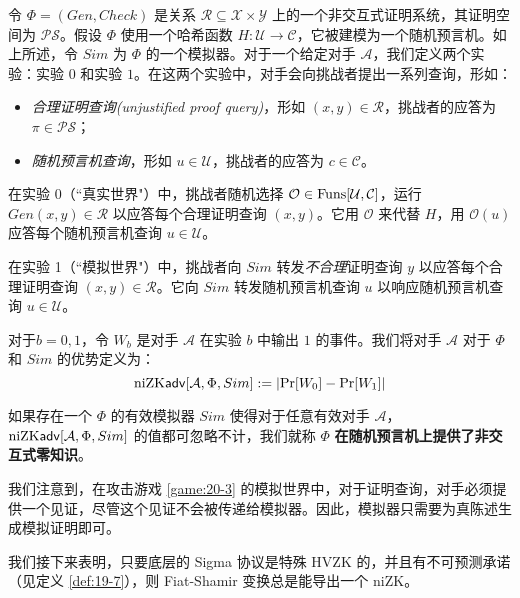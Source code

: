 \begin{game}[非交互式零知识]\label{game:20-3}
令 $\Phi=(Gen,Check)$ 是关系 $\mathcal{R}\subseteq\mathcal{X}\times\mathcal{Y}$ 上的一个非交互式证明系统，其证明空间为 $\mathcal{PS}$。假设 $\Phi$ 使用一个哈希函数 $H:\mathcal{U}\to\mathcal{C}$，它被建模为一个随机预言机。如上所述，令 $Sim$ 为 $\Phi$ 的一个模拟器。对于一个给定对手 $\mathcal{A}$，我们定义两个实验：实验 $0$ 和实验 $1$。在这两个实验中，对手会向挑战者提出一系列查询，形如：
\begin{itemize}
	\item \emph{合理证明查询(unjustified proof query)}，形如 $(x,y)\in\mathcal{R}$，挑战者的应答为 $\pi\in\mathcal{PS}$；
	\item \emph{随机预言机查询}，形如 $u\in\mathcal{U}$，挑战者的应答为 $c\in\mathcal{C}$。
\end{itemize}

在实验 0（``真实世界"）中，挑战者随机选择 $\mathcal{O}\in{\rm Funs}[\mathcal{U},\mathcal{C}]$，运行 $Gen(x,y)\in\mathcal{R}$ 以应答每个合理证明查询 $(x,y)$。它用 $\mathcal O$ 来代替 $H$，用 $\mathcal{O}(u)$ 应答每个随机预言机查询 $u\in\mathcal{U}$。

在实验 1（``模拟世界"）中，挑战者向 $Sim$ 转发\emph{不合理}证明查询 $y$ 以应答每个合理证明查询 $(x,y)\in\mathcal{R}$。它向 $Sim$ 转发随机预言机查询 $u$ 以响应随机预言机查询 $u\in\mathcal{U}$。

对于$b=0,1$，令 $W_b$ 是对手 $\mathcal{A}$ 在实验 $b$ 中输出 $1$ 的事件。我们将对手 $\mathcal{A}$ 对于 $\Phi$ 和 $Sim$ 的优势定义为：
$$
{\rm niZK\mathsf{adv}}[\mathcal{A},\Phi,Sim]:=\left|\Pr[W_0]-\Pr[W_1]\right|
$$
\end{game}

\begin{definition}\label{def:20-5}
如果存在一个 $\Phi$ 的有效模拟器 $Sim$ 使得对于任意有效对手 $\mathcal{A}$，${\rm niZK\mathsf{adv}}[\mathcal{A},\Phi,Sim]$ 的值都可忽略不计，我们就称 $\Phi$ \textbf{在随机预言机上提供了非交互式零知识}。
\end{definition}

我们注意到，在攻击游戏 \ref{game:20-3} 的模拟世界中，对于证明查询，对手必须提供一个见证，尽管这个见证不会被传递给模拟器。因此，模拟器只需要为真陈述生成模拟证明即可。

我们接下来表明，只要底层的 Sigma 协议是特殊 HVZK 的，并且有不可预测承诺（见定义 \ref{def:19-7}），则 Fiat-Shamir 变换总是能导出一个 niZK。

